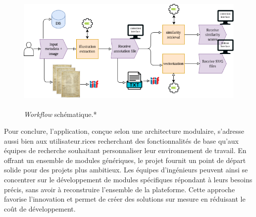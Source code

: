  \begin{figure}[H]
          \begin{center}
          \includegraphics[height=6cm]{figues/workflow.png}
          \end{center}
          \caption{\emph{Workflow} schématique.*}
          \label{fig:workflow} \end{figure}

Pour conclure, l'application, conçue selon une architecture modulaire,
s'adresse aussi bien aux utilisateur.rices recherchant des fonctionnalités de
base qu'aux équipes de recherche souhaitant personnaliser leur
environnement de travail. En offrant un ensemble de modules génériques,
le projet \eida fournit un point de départ solide pour des projets plus
ambitieux. Les équipes d'ingénieurs peuvent ainsi se concentrer sur le
développement de modules spécifiques répondant à leurs besoins précis,
sans avoir à reconstruire l'ensemble de la plateforme. Cette approche
favorise l'innovation et permet de créer des solutions sur mesure en
réduisant le coût de développement.
